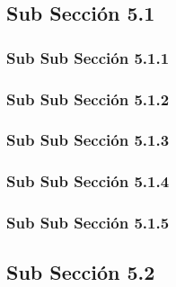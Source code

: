\subsection{Sub Sección 5.1}
\label{sec:51SubSección}

\subsubsection{Sub Sub Sección 5.1.1}
\label{sec:511SubSubSección}

\subsubsection{Sub Sub Sección 5.1.2}
\label{sec:512SubSubSección}

\subsubsection{Sub Sub Sección 5.1.3}
\label{sec:513SubSubSección}

\subsubsection{Sub Sub Sección 5.1.4}
\label{sec:514SubSubSección}

\subsubsection{Sub Sub Sección 5.1.5}
\label{sec:515SubSubSección}

\subsection{Sub Sección 5.2}
\label{sec:52SubSección}

